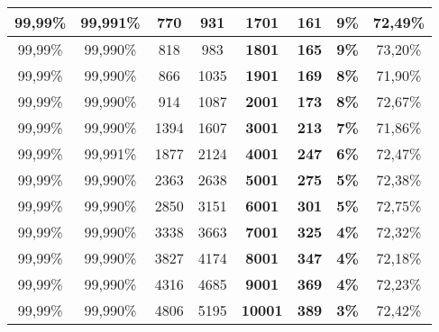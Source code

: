 \begin{table}[H]
{\begin{tabular}{cccc
>{\columncolor[HTML]{8D3CE1}}c 
>{\columncolor[HTML]{5754D6}}c 
>{\columncolor[HTML]{8FFFFB}}c c}
99,99\% & 99,991\% & 770 & 931 & \textbf{1701} & \textbf{161} & \textbf{9\%} & 72,49\% \\ \hline
\cellcolor[HTML]{C0C0C0}99,99\% & \cellcolor[HTML]{C0C0C0}99,990\% & \cellcolor[HTML]{C0C0C0}818 & \cellcolor[HTML]{C0C0C0}983 & \textbf{1801} & \textbf{165} & \textbf{9\%} & \cellcolor[HTML]{C0C0C0}73,20\% \\ \hline
99,99\% & 99,990\% & 866 & 1035 & \textbf{1901} & \textbf{169} & \textbf{8\%} & 71,90\% \\ \hline
\cellcolor[HTML]{C0C0C0}99,99\% & \cellcolor[HTML]{C0C0C0}99,990\% & \cellcolor[HTML]{C0C0C0}914 & \cellcolor[HTML]{C0C0C0}1087 & \textbf{2001} & \textbf{173} & \textbf{8\%} & \cellcolor[HTML]{C0C0C0}72,67\% \\ \hline
99,99\% & 99,990\% & 1394 & 1607 & \textbf{3001} & \textbf{213} & \textbf{7\%} & 71,86\% \\ \hline
\cellcolor[HTML]{C0C0C0}99,99\% & \cellcolor[HTML]{C0C0C0}99,991\% & \cellcolor[HTML]{C0C0C0}1877 & \cellcolor[HTML]{C0C0C0}2124 & \textbf{4001} & \textbf{247} & \textbf{6\%} & \cellcolor[HTML]{C0C0C0}72,47\% \\ \hline
99,99\% & 99,990\% & 2363 & 2638 & \textbf{5001} & \textbf{275} & \textbf{5\%} & 72,38\% \\ \hline
\cellcolor[HTML]{C0C0C0}99,99\% & \cellcolor[HTML]{C0C0C0}99,990\% & \cellcolor[HTML]{C0C0C0}2850 & \cellcolor[HTML]{C0C0C0}3151 & \textbf{6001} & \textbf{301} & \textbf{5\%} & \cellcolor[HTML]{C0C0C0}72,75\% \\ \hline
99,99\% & 99,990\% & 3338 & 3663 & \textbf{7001} & \textbf{325} & \textbf{4\%} & 72,32\% \\ \hline
\cellcolor[HTML]{C0C0C0}99,99\% & \cellcolor[HTML]{C0C0C0}99,990\% & \cellcolor[HTML]{C0C0C0}3827 & \cellcolor[HTML]{C0C0C0}4174 & \textbf{8001} & \textbf{347} & \textbf{4\%} & \cellcolor[HTML]{C0C0C0}72,18\% \\ \hline
99,99\% & 99,990\% & 4316 & 4685 & \textbf{9001} & \textbf{369} & \textbf{4\%} & 72,23\% \\ \hline
\cellcolor[HTML]{C0C0C0}99,99\% & \cellcolor[HTML]{C0C0C0}99,990\% & \cellcolor[HTML]{C0C0C0}4806 & \cellcolor[HTML]{C0C0C0}5195 & \textbf{10001} & \textbf{389} & \textbf{3\%} & \cellcolor[HTML]{C0C0C0}72,42\% \\ \hline
\end{tabular}%
}
\end{table}
